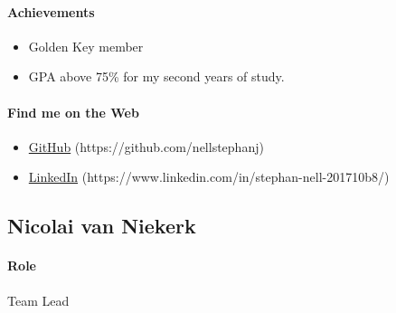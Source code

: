 \documentclass{article}
\begin{document}
        \paragraph{Achievements}
            \begin{itemize}
                \item Golden Key member
                \item GPA above 75\% for my second years of study.
            \end{itemize}
            
        \paragraph{Find me on the Web}
            \begin{itemize}
                \item \href{https://github.com/nellstephanj}{GitHub} (https://github.com/nellstephanj)
                \item \href{https://www.linkedin.com/in/stephan-nell-201710b8/}{LinkedIn} (https://www.linkedin.com/in/stephan-nell-201710b8/)
            \end{itemize}

\newpage    
    \subsection{Nicolai van Niekerk}
        \paragraph{Role} Team Lead 
        
\end{document}
